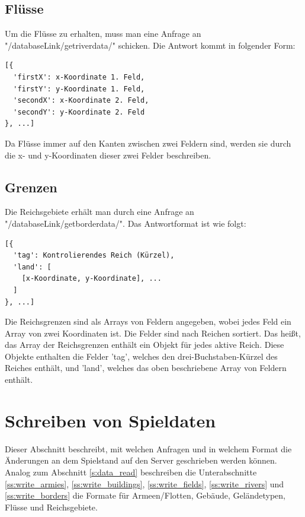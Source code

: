 \documentclass[11pt,a4paper,twocolumn]{article}
\begin{document}
\subsection{Flüsse}\label{ss:read_rivers}
Um die Flüsse zu erhalten, muss man eine Anfrage an "/databaseLink/getriverdata/" schicken. Die Antwort kommt in folgender Form:
\begin{lstlisting}
[{
  'firstX': x-Koordinate 1. Feld,
  'firstY': y-Koordinate 1. Feld,
  'secondX': x-Koordinate 2. Feld,
  'secondY': y-Koordinate 2. Feld
}, ...]
\end{lstlisting}
Da Flüsse immer auf den Kanten zwischen zwei Feldern sind, werden sie durch die x- und y-Koordinaten dieser zwei Felder beschreiben.
\subsection{Grenzen}\label{ss:read_borders}
Die Reichsgebiete erhält man durch eine Anfrage an "/databaseLink/getborderdata/". Das Antwortformat ist wie folgt:
\begin{lstlisting}
[{
  'tag': Kontrolierendes Reich (Kürzel),
  'land': [
    [x-Koordinate, y-Koordinate], ...
  ]
}, ...]
\end{lstlisting}
Die Reichsgrenzen sind als Arrays von Feldern angegeben, wobei jedes Feld ein Array von zwei Koordinaten ist. Die Felder sind nach Reichen sortiert. Das heißt, das Array der Reichsgrenzen enthält ein Objekt für jedes aktive Reich. Diese Objekte enthalten die Felder 'tag', welches den drei-Buchstaben-Kürzel des Reiches enthält, und 'land', welches das oben beschriebene Array von Feldern enthält.

\section{Schreiben von Spieldaten}\label{s:data_write}
Dieser Abschnitt beschreibt, mit welchen Anfragen und in welchem Format die Änderungen an dem Spielstand auf den Server geschrieben werden können. Analog zum Abschnitt \ref{s:data_read} beschreiben die Unterabschnitte \ref{ss:write_armies}, \ref{ss:write_buildings}, \ref{ss:write_fields}, \ref{ss:write_rivers} und \ref{ss:write_borders} die Formate für Armeen/Flotten, Gebäude, Geländetypen, Flüsse und Reichsgebiete.
\end{document}
